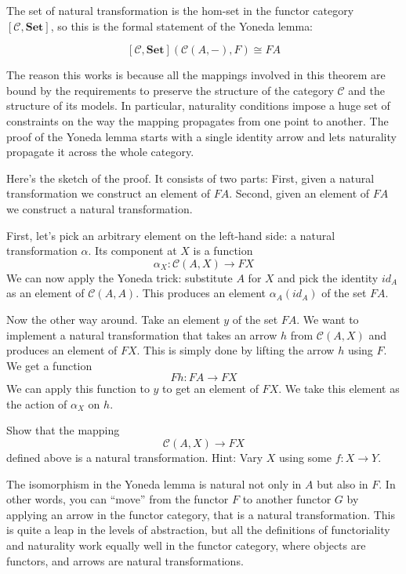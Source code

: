 \documentclass[DaoFP]{subfiles}
\begin{document}
The set of natural transformation is the hom-set in the functor category $[\mathcal{C}, \mathbf{Set}]$, so this is the formal statement of the Yoneda lemma:

\[ [\mathcal{C}, \mathbf{Set}]( \mathcal{C}(A, -), F) \cong F A \]

The reason this works is because all the mappings involved in this theorem are bound by the requirements to preserve the structure of the category $\mathcal{C}$ and the structure of its models. In particular, naturality conditions impose a huge set of constraints on the way the mapping propagates from one point to another. The proof of the Yoneda lemma starts with a single identity arrow and lets naturality propagate it across the whole category.

Here's the sketch of the proof. It consists of two parts: First, given a natural transformation we construct an element of $F A$. Second, given an element of $F A$ we construct a natural transformation. 

First, let's pick an arbitrary element on the left-hand side: a natural transformation $\alpha$. Its component at $X$ is a function
\[ \alpha_X \colon \mathcal{C}(A, X) \to F X \]
We can now apply the Yoneda trick: substitute $A$ for $X$ and pick the identity $id_A$ as an element of $\mathcal{C}(A, A)$. This produces an element $\alpha_A (id_A)$ of the set $F A$.

Now the other way around. Take an element $y$ of the set $F A$. We want to implement a natural transformation that takes an arrow $h$ from $ \mathcal{C}(A, X)$ and produces an element of $F X$. This is simply done by lifting the arrow $h$ using $F$. We get a function
\[F h \colon F A \to F X \]
We can apply this function to $y$ to get an element of $F X$. We take this element as the action of $\alpha_X$ on $h$.

\begin{exercise}
Show that the mapping 
\[ \mathcal{C}(A, X) \to F X\]
defined above is a natural transformation. Hint: Vary $X$ using some $f \colon X \to Y$.
\end{exercise}

The isomorphism in the Yoneda lemma is natural not only in $A$ but also in $F$. In other words, you can ``move'' from the functor $F$ to another functor $G$ by applying an arrow in the functor category, that is a natural transformation. This is quite a leap in the levels of abstraction, but all the definitions of functoriality and naturality work equally well in the functor category, where objects are functors, and arrows are natural transformations.
\end{document}
